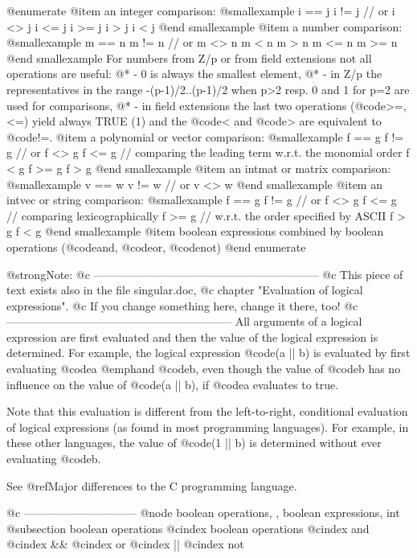 {{@enumerate
@item
an integer comparison:
@smallexample
  i == j
  i != j    // or     i <> j
  i <= j
  i >= j
  i > j
  i < j
@end smallexample
@item
a number comparison:
@smallexample
  m == n
  m != n    // or     m <> n
  m < n
  m > n
  m <= n
  m >= n
@end smallexample
For numbers from Z/p or from field extensions not all operations are useful:
@* - 0 is always the smallest element,
@* - in Z/p the representatives in the range -(p-1)/2..(p-1)/2 when p>2 resp.
     0 and 1 for p=2 are used for comparisons,
@* - in field extensions the last two operations
(@code{>=,<=}) yield always TRUE (1) and
the @code{<} and @code{>} are equivalent to @code{!=}.
@item
a polynomial or vector comparison:
@smallexample
  f == g
  f != g    // or     f <> g
  f <= g    // comparing the leading term w.r.t. the monomial order
  f <  g
  f >= g
  f >  g
@end smallexample
@item
an intmat or matrix comparison:
@smallexample
  v == w
  v != w    // or     v <> w
@end smallexample
@item
an intvec or  string comparison:
@smallexample
  f == g
  f != g    // or     f <> g
  f <= g    // comparing lexicographically
  f >= g    // w.r.t. the order specified by ASCII
  f >  g
  f <  g
@end smallexample
@item
boolean expressions combined by boolean operations (@code{and},
@code{or}, @code{not})
@end enumerate

@strong{Note:}
@c ------------------------------------------------------------
@c   This piece of text exists also in the file singular.doc,
@c   chapter "Evaluation of logical expressions".
@c   If you change something here, change it there, too!
@c ------------------------------------------------------------
All arguments of a logical expression are first evaluated and
then the value of the logical expression is determined. For example, the
logical expression @code{(a || b)} is evaluated by first evaluating
@code{a} @emph{and} @code{b}, even though the value of @code{b} has no
influence on the value of @code{(a || b)}, if @code{a} evaluates to
true.

Note that this evaluation is different from the left-to-right, conditional
evaluation of logical expressions (as found in most programming
languages). For example, in these other languages, the value of @code{(1
|| b)} is determined without ever evaluating @code{b}.

See @ref{Major differences to the C programming language}.

@c ------------------------------
@node boolean operations, , boolean expressions, int
@subsection boolean operations
@cindex boolean operations
@cindex and
@cindex &&
@cindex or
@cindex ||
@cindex not

}}

